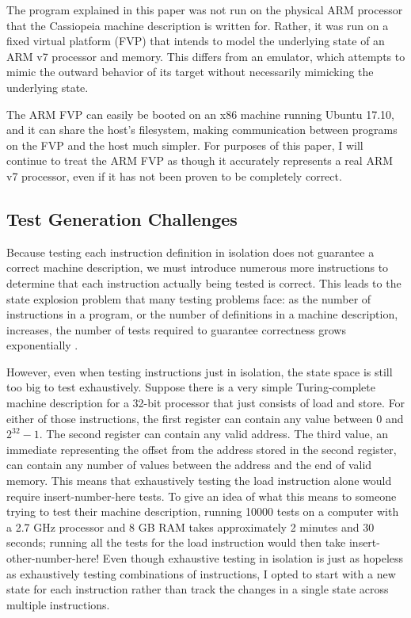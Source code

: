 \documentclass[letterpaper,12pt]{article}
\begin{document}
The program explained in this paper was not run on the physical ARM processor that the Cassiopeia machine description is written for. Rather, it was run on a fixed virtual platform (FVP) that intends to model the underlying state of an ARM v7 processor and memory. This differs from an emulator, which attempts to mimic the outward behavior of its target without necessarily mimicking the underlying state.

The ARM FVP can easily be booted on an x86 machine running Ubuntu 17.10, and it can share the host's filesystem, making communication between programs on the FVP and the host much simpler. For purposes of this paper, I will continue to treat the ARM FVP as though it accurately represents a real ARM v7 processor, even if it has not been proven to be completely correct.

\subsection{Test Generation Challenges}

Because testing each instruction definition in isolation does not guarantee a correct machine description, we must introduce numerous more instructions to determine that each instruction actually being tested is correct. This leads to the state explosion problem that many testing problems face: as the number of instructions in a program, or the number of definitions in a machine description, increases, the number of tests required to guarantee correctness grows exponentially \cite{Klee}. 

However, even when testing instructions just in isolation, the state space is still too big to test exhaustively. Suppose there is a very simple Turing-complete machine description for a 32-bit processor that just consists of load and store. For either of those instructions, the first register can contain any value between 0 and $2^{32} - 1$. The second register can contain any valid address. The third value, an immediate representing the offset from the address stored in the second register, can contain any number of values between the address and the end of valid memory. This means that exhaustively testing the load instruction alone would require insert-number-here tests. To give an idea of what this means to someone trying to test their machine description, running 10000 tests on a computer with a 2.7 GHz processor and 8 GB RAM takes approximately 2 minutes and 30 seconds; running all the tests for the load instruction would then take insert-other-number-here! Even though exhaustive testing in isolation is just as hopeless as exhaustively testing combinations of instructions, I opted to start with a new state for each instruction rather than track the changes in a single state across multiple instructions.
\end{document}
